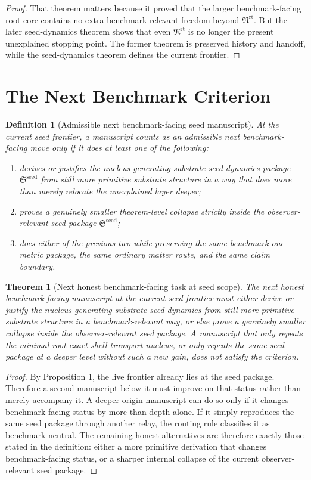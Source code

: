 \documentclass[11pt]{article}
\newcommand{\RootNucleus}{\mathfrak N^{\mathrm{rt}}}
\newcommand{\SeedPackage}{\mathfrak S^{\mathrm{seed}}}
\newtheorem{definition}{Definition}
\newtheorem{theorem}{Theorem}
\begin{document}
\begin{proof}
That theorem matters because it proved that the larger benchmark-facing root core contains no extra benchmark-relevant freedom beyond \(\RootNucleus\). But the later seed-dynamics theorem shows that even \(\RootNucleus\) is no longer the present unexplained stopping point. The former theorem is preserved history and handoff, while the seed-dynamics theorem defines the current frontier.
\end{proof}

\section{The Next Benchmark Criterion}

\begin{definition}[Admissible next benchmark-facing seed manuscript]
At the current seed frontier, a manuscript counts as an admissible next benchmark-facing move only if it does at least one of the following:
\begin{enumerate}
    \item derives or justifies the nucleus-generating substrate seed dynamics package \(\SeedPackage\) from still more primitive substrate structure in a way that does more than merely relocate the unexplained layer deeper;
    \item proves a genuinely smaller theorem-level collapse strictly inside the observer-relevant seed package \(\SeedPackage\);
    \item does either of the previous two while preserving the same benchmark one-metric package, the same ordinary matter route, and the same claim boundary.
\end{enumerate}
\end{definition}

\begin{theorem}[Next honest benchmark-facing task at seed scope]
The next honest benchmark-facing manuscript at the current seed frontier must either derive or justify the nucleus-generating substrate seed dynamics from still more primitive substrate structure in a benchmark-relevant way, or else prove a genuinely smaller collapse inside the observer-relevant seed package. A manuscript that only repeats the minimal root exact-shell transport nucleus, or only repeats the same seed package at a deeper level without such a new gain, does not satisfy the criterion.
\end{theorem}

\begin{proof}
By Proposition 1, the live frontier already lies at the seed package. Therefore a second manuscript below it must improve on that status rather than merely accompany it. A deeper-origin manuscript can do so only if it changes benchmark-facing status by more than depth alone. If it simply reproduces the same seed package through another relay, the routing rule classifies it as benchmark neutral. The remaining honest alternatives are therefore exactly those stated in the definition: either a more primitive derivation that changes benchmark-facing status, or a sharper internal collapse of the current observer-relevant seed package.
\end{proof}
\end{document}
